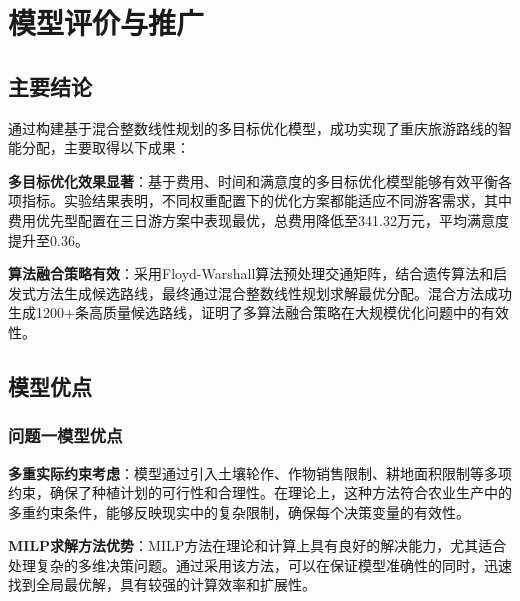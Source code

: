 \chapter[\hspace{0pt}模型评价与推广]{{\heiti{}\hspace{0pt}模型评价与推广}}\label{chapter4: 模型评价与推广}
\removelofgap
\removelotgap

\section[\hspace{-2pt}主要结论]{{\heiti{} \hspace{-8pt}主要结论}}\label{section5: 主要结论}

通过构建基于混合整数线性规划的多目标优化模型，成功实现了重庆旅游路线的智能分配，主要取得以下成果：

\noindent\textbf{多目标优化效果显著}：基于费用、时间和满意度的多目标优化模型能够有效平衡各项指标。实验结果表明，不同权重配置下的优化方案都能适应不同游客需求，其中费用优先型配置在三日游方案中表现最优，总费用降低至341.32万元，平均满意度提升至0.36。

\noindent\textbf{算法融合策略有效}：采用Floyd-Warshall算法预处理交通矩阵，结合遗传算法和启发式方法生成候选路线，最终通过混合整数线性规划求解最优分配。混合方法成功生成1200+条高质量候选路线，证明了多算法融合策略在大规模优化问题中的有效性。

\section[\hspace{-2pt}模型优点]{{\heiti{} \hspace{-8pt}模型优点}}\label{section5: 模型优点}

\subsection[\hspace{-2pt}问题一模型优点]{{\heiti{} \hspace{-8pt}问题一模型优点}}\label{subsection5: 问题一模型优点}

\noindent\textbf{多重实际约束考虑}：模型通过引入土壤轮作、作物销售限制、耕地面积限制等多项约束，确保了种植计划的可行性和合理性。在理论上，这种方法符合农业生产中的多重约束条件，能够反映现实中的复杂限制，确保每个决策变量的有效性。

\noindent\textbf{MILP求解方法优势}：MILP方法在理论和计算上具有良好的解决能力，尤其适合处理复杂的多维决策问题。通过采用该方法，可以在保证模型准确性的同时，迅速找到全局最优解，具有较强的计算效率和扩展性。
